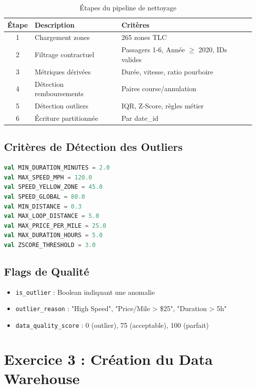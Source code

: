 \documentclass[12pt,a4paper]{report}
\begin{document}
\begin{table}[H]
\centering
\caption{Étapes du pipeline de nettoyage}
\begin{tabular}{@{}clp{7cm}@{}}
\toprule
\textbf{Étape} & \textbf{Description} & \textbf{Critères} \\
\midrule
1 & Chargement zones & 265 zones TLC \\
2 & Filtrage contractuel & Passagers 1-6, Année $\geq$ 2020, IDs valides \\
3 & Métriques dérivées & Durée, vitesse, ratio pourboire \\
4 & Détection remboursements & Paires course/annulation \\
5 & Détection outliers & IQR, Z-Score, règles métier \\
6 & Écriture partitionnée & Par date\_id \\
\bottomrule
\end{tabular}
\end{table}

\subsection{Critères de Détection des Outliers}

\begin{lstlisting}[language=Scala, caption=Seuils de detection des outliers]
val MIN_DURATION_MINUTES = 2.0
val MAX_SPEED_MPH = 120.0
val SPEED_YELLOW_ZONE = 45.0
val SPEED_GLOBAL = 80.0
val MIN_DISTANCE = 0.3
val MAX_LOOP_DISTANCE = 5.0
val MAX_PRICE_PER_MILE = 25.0
val MAX_DURATION_HOURS = 5.0
val ZSCORE_THRESHOLD = 3.0
\end{lstlisting}

\subsection{Flags de Qualité}

\begin{itemize}
    \item \texttt{is\_outlier} : Boolean indiquant une anomalie
    \item \texttt{outlier\_reason} : "High Speed", "Price/Mile > \$25", "Duration > 5h"
    \item \texttt{data\_quality\_score} : 0 (outlier), 75 (acceptable), 100 (parfait)
\end{itemize}

\section{Exercice 3 : Création du Data Warehouse}
\end{document}
